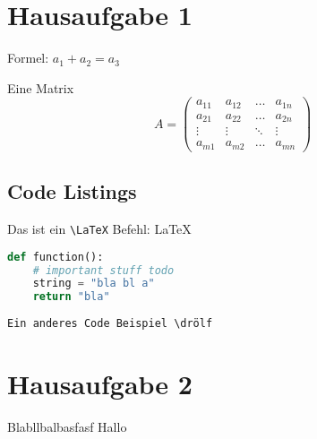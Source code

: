 \documentclass[a4paper,onecolumn]{scrartcl}
\title{\mytitle{}}
\subtitle{\mysubtitle{}}
\author{\myname{}}
\date{\mydate{}}
\newif\ifdraft\draftfalse
\numberwithin{equation}{section}
\theoremstyle{plain} %
\theoremstyle{remark}
\begin{document}
\ifdraft\else\maketitle\fi

\setcounter{tocdepth}{2}
\setcounter{secnumdepth}{0}
\tableofcontents


\section{Hausaufgabe 1}

Formel: $ a_1 + a_2 = a_3 $

Eine Matrix
\begin{equation}
  A = \begin{pmatrix}
    a_{11}  & a_{12} & \ldots & a_{1n} \\
    a_{21}  & a_{22} & \ldots & a_{2n} \\
    \vdots & \vdots & \ddots & \vdots \\
    a_{m1} & a_{m2} & \ldots & a_{mn}
  \end{pmatrix}
\end{equation}

\subsection{Code Listings}

Das ist ein \verb+\LaTeX+ Befehl: \LaTeX

\begin{lstlisting}[caption={Useless Code},language=Python]
def function():
    # important stuff todo
    string = "bla bl a"
    return "bla"
\end{lstlisting}

\begin{verbatim}
Ein anderes Code Beispiel \drölf
\end{verbatim}

\section{Hausaufgabe 2}

Blabllbalbasfasf Hallo

\end{document}
